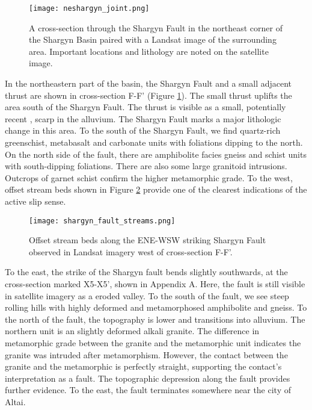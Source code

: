 \begin{figure}[h!]
  \centering
  \texttt{[image: neshargyn\_joint.png]}
  \caption{A cross-section through the Shargyn Fault in the northeast corner of the Shargyn Basin paired with a Landsat image of the surrounding area. Important locations and lithology are noted on the satellite image.}
  \label{neshargyn_joint}
\end{figure}

In the northeastern part of the basin, the Shargyn Fault and a small adjacent thrust are shown in cross-section F-F' (Figure \ref{neshargyn_joint}). The small thrust uplifts the area south of the Shargyn Fault. The thrust is visible as a small, potentially recent \citep{Bayasgalan2005a}, scarp in the alluvium. The Shargyn Fault marks a major lithologic change in this area. To the south of the Shargyn Fault, we find quartz-rich greenschist, metabasalt and carbonate units with foliations dipping to the north. On the north side of the fault, there are amphibolite facies gneiss and schist units with south-dipping foliations. There are also some large granitoid intrusions. Outcrops of garnet schist confirm the higher metamorphic grade. To the west, offset stream beds shown in Figure \ref{shargynoffsetstreams} provide one of the clearest indications of the active slip sense.

\begin{figure}[h!]
  \centering
  \texttt{[image: shargyn\_fault\_streams.png]}
  \caption{Offset stream beds along the ENE-WSW striking Shargyn Fault observed in Landsat imagery west of cross-section F-F'.}
  \label{shargynoffsetstreams}
\end{figure}

To the east, the strike of the Shargyn fault bends slightly southwards, at the cross-section marked X5-X5', shown in Appendix A. Here, the fault is still visible in satellite imagery as a eroded valley. To the south of the fault, we see steep rolling hills with highly deformed and metamorphosed amphibolite and gneiss. To the north of the fault, the topography is lower and transitions into alluvium. The northern unit is an slightly deformed alkali granite. The difference in metamorphic grade between the granite and the metamorphic unit indicates the granite was intruded after metamorphism. However, the contact between the granite and the metamorphic is perfectly straight, supporting the contact's interpretation as a fault. The topographic depression along the fault provides further evidence. To the east, the fault terminates somewhere near the city of Altai. 

